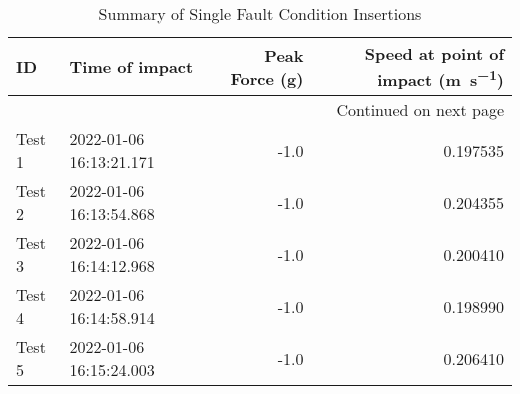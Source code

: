 \begin{longtable}{llrr}
\caption{Summary of Single Fault Condition Insertions}\label{hard}\\
\toprule
     ID &          Time of impact &  Peak Force (\unit{\gram}) &  Speed at point of impact (\unit{\metre\per\second}) \\
\midrule
\endhead
\midrule
\multicolumn{4}{r}{{Continued on next page}} \\
\midrule
\endfoot

\bottomrule
\endlastfoot
 Test 1 & 2022-01-06 16:13:21.171 &                       -1.0 &                                           0.197535 \\
 Test 2 & 2022-01-06 16:13:54.868 &                       -1.0 &                                           0.204355 \\
 Test 3 & 2022-01-06 16:14:12.968 &                       -1.0 &                                           0.200410 \\
 Test 4 & 2022-01-06 16:14:58.914 &                       -1.0 &                                           0.198990 \\
 Test 5 & 2022-01-06 16:15:24.003 &                       -1.0 &                                           0.206410 \\
\end{longtable}
